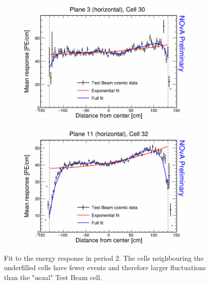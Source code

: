 \begin{figure}[h]
  \begin{subfigure}{0.5\textwidth}
    \includegraphics[width=\linewidth]{RelativeCalibrationResults/p2_003_030.png}
  \end{subfigure}
  \begin{subfigure}{0.5\textwidth}
    \includegraphics[width=\linewidth]{RelativeCalibrationResults/p2_011_032.png}
  \end{subfigure}
  \caption{Fit to the energy response in period 2. The cells neighbouring the underfilled cells have fewer events and therefore larger fluctuations than the "usual" Test Beam cell.}
  \label{fig:AttenfitResultsPerio2_UnderfilledCells}
\end{figure}

